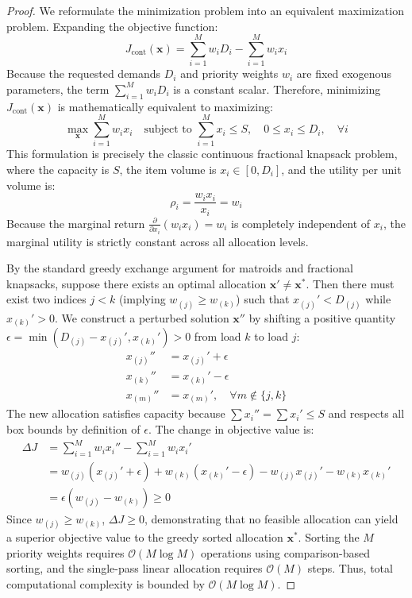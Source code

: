 \documentclass[11pt,a4paper]{article}
\theoremstyle{definition}
\theoremstyle{remark}
\begin{document}
\begin{proof}
We reformulate the minimization problem into an equivalent maximization problem. Expanding the objective function:
\begin{equation}
J_{\text{cont}}(\mathbf{x}) = \sum_{i=1}^M w_i D_i - \sum_{i=1}^M w_i x_i
\end{equation}
Because the requested demands $D_i$ and priority weights $w_i$ are fixed exogenous parameters, the term $\sum_{i=1}^M w_i D_i$ is a constant scalar. Therefore, minimizing $J_{\text{cont}}(\mathbf{x})$ is mathematically equivalent to maximizing:
\begin{equation}
\max_{\mathbf{x}} \sum_{i=1}^M w_i x_i \quad \text{subject to } \sum_{i=1}^M x_i \le S, \quad 0 \le x_i \le D_i, \quad \forall i
\end{equation}
This formulation is precisely the classic continuous fractional knapsack problem, where the capacity is $S$, the item volume is $x_i \in [0, D_i]$, and the utility per unit volume is:
\begin{equation}
\rho_i = \frac{w_i x_i}{x_i} = w_i
\end{equation}
Because the marginal return $\frac{\partial}{\partial x_i} (w_i x_i) = w_i$ is completely independent of $x_i$, the marginal utility is strictly constant across all allocation levels. 

By the standard greedy exchange argument for matroids and fractional knapsacks, suppose there exists an optimal allocation $\mathbf{x}' \ne \mathbf{x}^*$. Then there must exist two indices $j < k$ (implying $w_{(j)} \ge w_{(k)}$) such that $x_{(j)}' < D_{(j)}$ while $x_{(k)}' > 0$. We construct a perturbed solution $\mathbf{x}''$ by shifting a positive quantity $\epsilon = \min(D_{(j)} - x_{(j)}', x_{(k)}') > 0$ from load $k$ to load $j$:
\begin{align}
x_{(j)}'' &= x_{(j)}' + \epsilon \\
x_{(k)}'' &= x_{(k)}' - \epsilon \\
x_{(m)}'' &= x_{(m)}', \quad \forall m \notin \{j, k\}
\end{align}
The new allocation satisfies capacity because $\sum x_i'' = \sum x_i' \le S$ and respects all box bounds by definition of $\epsilon$. The change in objective value is:
\begin{align}
\Delta J &= \sum_{i=1}^M w_i x_i'' - \sum_{i=1}^M w_i x_i' \nonumber \\
&= w_{(j)} (x_{(j)}' + \epsilon) + w_{(k)} (x_{(k)}' - \epsilon) - w_{(j)} x_{(j)}' - w_{(k)} x_{(k)}' \nonumber \\
&= \epsilon \left( w_{(j)} - w_{(k)} \right) \ge 0
\end{align}
Since $w_{(j)} \ge w_{(k)}$, $\Delta J \ge 0$, demonstrating that no feasible allocation can yield a superior objective value to the greedy sorted allocation $\mathbf{x}^*$. Sorting the $M$ priority weights requires $\mathcal{O}(M \log M)$ operations using comparison-based sorting, and the single-pass linear allocation requires $\mathcal{O}(M)$ steps. Thus, total computational complexity is bounded by $\mathcal{O}(M \log M)$.
\end{proof}
\end{document}
